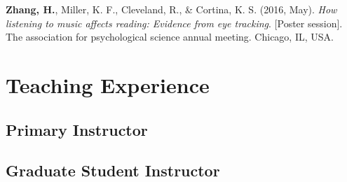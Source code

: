 \documentclass[11pt,a4paper,]{awesome-cv}
\begin{document}
\leavevmode{}%
\textbf{Zhang, H.}, Miller, K. F., Cleveland, R., \& Cortina, K. S.
(2016, May). \emph{How listening to music affects reading: Evidence from
eye tracking}. {[}Poster session{]}. The association for psychological
science annual meeting. Chicago, IL, USA.

\hypertarget{teaching-experience}{%
\section{Teaching Experience}\label{teaching-experience}}

\hypertarget{primary-instructor}{%
\subsection{Primary Instructor}\label{primary-instructor}}

\begin{cventries}
    \vspace{-4.0mm}
\end{cventries}

\hypertarget{graduate-student-instructor}{%
\subsection{Graduate Student
Instructor}\label{graduate-student-instructor}}
\end{document}
